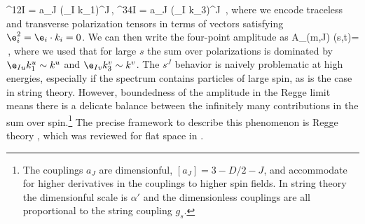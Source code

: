 ^{12I} = a_J (\e_I \cdot k_1)^{J}\,, \qquad \qquad
{}^{34I} = a_J (\e_I \cdot k_3)^{J}
\,,
\eeq
where we encode traceless and transverse polarization tensors in terms of
vectors satisfying $\e_i^2 =  \e_i \cdot k_i = 0$.
We can then   write the four-point amplitude as
\beq
A_{(m,J)} (s,t)=
\approx
{} \,,
\label{eq:A_spinning_flat}
\eeq
where  we used that for large $s$ the sum over polarizations is dominated by $\e_{Iu} k_1^u \sim k^u$ and $\e_{Iv} k_3^v \sim k^v$.
The $s^J$ behavior is naively problematic at high energies, especially if the spectrum contains particles of large spin, as is the case in string theory. However, boundedness of the amplitude in the Regge limit means there is a delicate balance between the infinitely many contributions in the sum over spin.\footnote{The couplings $a_J$  are dimensionful,  $[a_J]= 3- D/2 -J$, and accommodate for higher derivatives in the couplings to higher spin fields. In string theory the dimensionful scale is $\alpha'$ and the dimensionless couplings are all proportional to the string coupling $g_s$.} The precise framework to describe this phenomenon is Regge theory \cite{Regge:1959mz}, which was reviewed for flat space in \cite{Costa:2012cb,Caron-Huot:2020nem}.

